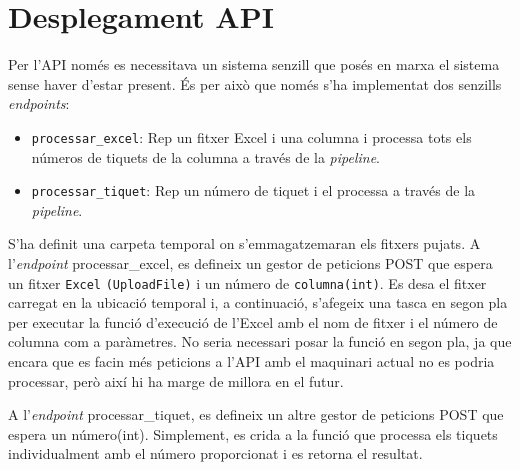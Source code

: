 \section{Desplegament API}

Per l'API només es necessitava un sistema senzill que posés en marxa el sistema sense haver d'estar present. És per això que només s'ha implementat dos senzills \textit{endpoints}:

\begin{itemize}
    \item \texttt{processar\_excel}: Rep un fitxer Excel i una columna i processa tots els números de tiquets de la columna a través de la \textit{pipeline}.
    \item \texttt{processar\_tiquet}: Rep un número de tiquet i el processa a través de la \textit{pipeline}.
\end{itemize}

S'ha definit una carpeta temporal on s'emmagatzemaran els fitxers pujats. A l'\textit{endpoint} \/processar\_excel\/, es defineix un gestor de peticions POST que espera un fitxer \texttt{Excel} \texttt{(UploadFile)} i un número de \texttt{columna(int)}. Es desa el fitxer carregat en la ubicació temporal i, a continuació, s'afegeix una tasca en segon pla per executar la funció d'execució de l'Excel amb el nom de fitxer i el número de columna com a paràmetres. No seria necessari posar la funció en segon pla, ja que encara que es facin més peticions a l'API amb el maquinari actual no es podria processar, però així hi ha marge de millora en el futur.

A l'\textit{endpoint} \/processar\_tiquet\/, es defineix un altre gestor de peticions POST que espera un número(int). Simplement, es crida a la funció que processa els tiquets individualment amb el número proporcionat i es retorna el resultat.